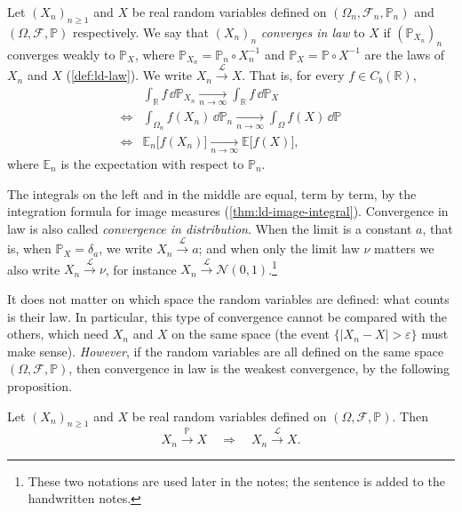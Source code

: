 \begin{definition}\label{def:cl-in-law}
Let $(X_n)_{n\ge1}$ and $X$ be real random variables defined on $(\Omega_n,\mathcal F_n,\mathbb P_n)$
and $(\Omega,\mathcal F,\mathbb P)$ respectively. We say that $(X_n)_n$ \emph{converges in law}
to $X$ if $(\mathbb P_{X_n})_n$ converges weakly to $\mathbb P_X$, where
$\mathbb P_{X_n}=\mathbb P_n\circ X_n^{-1}$ and $\mathbb P_X=\mathbb P\circ X^{-1}$ are the laws of
$X_n$ and $X$ (\cref{def:ld-law}). We write $X_n\xrightarrow{\mathcal L}X$. That is, for every
$f\in C_b(\mathbb R)$,
\[
\begin{aligned}
  &\int_{\mathbb R}f\,\dd\mathbb P_{X_n}\xrightarrow[n\to\infty]{}\int_{\mathbb R}f\,\dd\mathbb P_X\\
  \iff{}&\int_{\Omega_n}f(X_n)\,\dd\mathbb P_n\xrightarrow[n\to\infty]{}\int_\Omega f(X)\,\dd\mathbb P\\
  \iff{}&\mathbb E_n\big[f(X_n)\big]\xrightarrow[n\to\infty]{}\mathbb E\big[f(X)\big],
\end{aligned}
\]
where $\mathbb E_n$ is the expectation with respect to $\mathbb P_n$.
\end{definition}

The integrals on the left and in the middle are equal, term by term, by the integration
formula for image measures (\cref{thm:ld-image-integral}). Convergence in law is also called
\emph{convergence in distribution}. When the limit is a constant $a$, that is, when
$\mathbb P_X=\delta_a$, we write $X_n\xrightarrow{\mathcal L}a$; and when only the limit law
$\nu$ matters we also write $X_n\xrightarrow{\mathcal L}\nu$, for instance
$X_n\xrightarrow{\mathcal L}\mathcal N(0,1)$.\footnote{These two notations are used later in the
notes; the sentence is added to the handwritten notes.}

\begin{remark}\label{rem:cl-law-only}
It does not matter on which space the random variables are defined: what counts is their
law. In particular, this type of convergence cannot be compared with the others, which need
$X_n$ and $X$ on the same space (the event $\{|X_n-X|>\varepsilon\}$ must make sense).
\emph{However}, if the random variables are all defined on the same space
$(\Omega,\mathcal F,\mathbb P)$, then convergence in law is the weakest convergence, by the
following proposition.
\end{remark}

\begin{proposition}\label{prop:cl-P-implies-law}
Let $(X_n)_{n\ge1}$ and $X$ be real random variables defined on $(\Omega,\mathcal F,\mathbb P)$.
Then
\[
  X_n\xrightarrow{\mathbb P}X\quad\Longrightarrow\quad X_n\xrightarrow{\mathcal L}X .
\]
\end{proposition}

